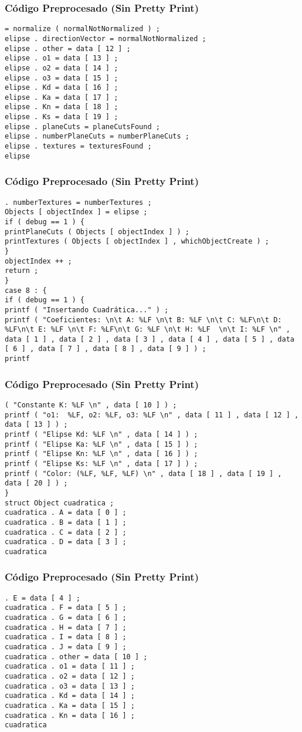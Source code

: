 \documentclass{beamer}
\begin{document}
\begin{frame}[fragile]
\frametitle{C\'odigo Preprocesado (Sin Pretty Print)}
\begin{lstlisting}[style=CStyle]
= normalize ( normalNotNormalized ) ; 
elipse . directionVector = normalNotNormalized ; 
elipse . other = data [ 12 ] ; 
elipse . o1 = data [ 13 ] ; 
elipse . o2 = data [ 14 ] ; 
elipse . o3 = data [ 15 ] ; 
elipse . Kd = data [ 16 ] ; 
elipse . Ka = data [ 17 ] ; 
elipse . Kn = data [ 18 ] ; 
elipse . Ks = data [ 19 ] ; 
elipse . planeCuts = planeCutsFound ; 
elipse . numberPlaneCuts = numberPlaneCuts ; 
elipse . textures = texturesFound ; 
elipse \end{lstlisting}
\end{frame}
\begin{frame}[fragile]
\frametitle{C\'odigo Preprocesado (Sin Pretty Print)}
\begin{lstlisting}[style=CStyle]
. numberTextures = numberTextures ; 
Objects [ objectIndex ] = elipse ; 
if ( debug == 1 ) { 
printPlaneCuts ( Objects [ objectIndex ] ) ; 
printTextures ( Objects [ objectIndex ] , whichObjectCreate ) ; 
} 
objectIndex ++ ; 
return ; 
} 
case 8 : { 
if ( debug == 1 ) { 
printf ( "Insertando Cuadrática..." ) ; 
printf ( "Coeficientes: \n\t A: %LF \n\t B: %LF \n\t C: %LF\n\t D: %LF\n\t E: %LF \n\t F: %LF\n\t G: %LF \n\t H: %LF  \n\t I: %LF \n" , data [ 1 ] , data [ 2 ] , data [ 3 ] , data [ 4 ] , data [ 5 ] , data [ 6 ] , data [ 7 ] , data [ 8 ] , data [ 9 ] ) ; 
printf \end{lstlisting}
\end{frame}
\begin{frame}[fragile]
\frametitle{C\'odigo Preprocesado (Sin Pretty Print)}
\begin{lstlisting}[style=CStyle]
( "Constante K: %LF \n" , data [ 10 ] ) ; 
printf ( "o1:  %LF, o2: %LF, o3: %LF \n" , data [ 11 ] , data [ 12 ] , data [ 13 ] ) ; 
printf ( "Elipse Kd: %LF \n" , data [ 14 ] ) ; 
printf ( "Elipse Ka: %LF \n" , data [ 15 ] ) ; 
printf ( "Elipse Kn: %LF \n" , data [ 16 ] ) ; 
printf ( "Elipse Ks: %LF \n" , data [ 17 ] ) ; 
printf ( "Color: (%LF, %LF, %LF) \n" , data [ 18 ] , data [ 19 ] , data [ 20 ] ) ; 
} 
struct Object cuadratica ; 
cuadratica . A = data [ 0 ] ; 
cuadratica . B = data [ 1 ] ; 
cuadratica . C = data [ 2 ] ; 
cuadratica . D = data [ 3 ] ; 
cuadratica \end{lstlisting}
\end{frame}
\begin{frame}[fragile]
\frametitle{C\'odigo Preprocesado (Sin Pretty Print)}
\begin{lstlisting}[style=CStyle]
. E = data [ 4 ] ; 
cuadratica . F = data [ 5 ] ; 
cuadratica . G = data [ 6 ] ; 
cuadratica . H = data [ 7 ] ; 
cuadratica . I = data [ 8 ] ; 
cuadratica . J = data [ 9 ] ; 
cuadratica . other = data [ 10 ] ; 
cuadratica . o1 = data [ 11 ] ; 
cuadratica . o2 = data [ 12 ] ; 
cuadratica . o3 = data [ 13 ] ; 
cuadratica . Kd = data [ 14 ] ; 
cuadratica . Ka = data [ 15 ] ; 
cuadratica . Kn = data [ 16 ] ; 
cuadratica \end{lstlisting}
\end{frame}
\end{document}
